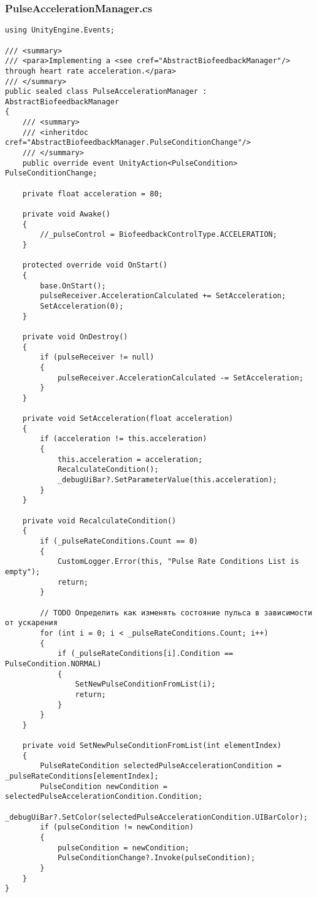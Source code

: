 \subsubsection*{PulseAccelerationManager.cs}
\begin{verbatim}
using UnityEngine.Events;

/// <summary>
/// <para>Implementing a <see cref="AbstractBiofeedbackManager"/> through heart rate acceleration.</para>
/// </summary>
public sealed class PulseAccelerationManager : AbstractBiofeedbackManager
{
    /// <summary>
    /// <inheritdoc cref="AbstractBiofeedbackManager.PulseConditionChange"/>
    /// </summary>
    public override event UnityAction<PulseCondition> PulseConditionChange;

    private float acceleration = 80;

    private void Awake()
    {
        //_pulseControl = BiofeedbackControlType.ACCELERATION;
    }

    protected override void OnStart()
    {
        base.OnStart();
        pulseReceiver.AccelerationCalculated += SetAcceleration;
        SetAcceleration(0);
    }

    private void OnDestroy()
    {
        if (pulseReceiver != null)
        {
            pulseReceiver.AccelerationCalculated -= SetAcceleration;
        }
    }

    private void SetAcceleration(float acceleration)
    {
        if (acceleration != this.acceleration)
        {
            this.acceleration = acceleration;
            RecalculateCondition();
            _debugUiBar?.SetParameterValue(this.acceleration);
        }
    }

    private void RecalculateCondition()
    {
        if (_pulseRateConditions.Count == 0)
        {
            CustomLogger.Error(this, "Pulse Rate Conditions List is empty");
            return;
        }

        // TODO Определить как изменять состояние пульса в зависимости от ускарения
        for (int i = 0; i < _pulseRateConditions.Count; i++)
        {
            if (_pulseRateConditions[i].Condition == PulseCondition.NORMAL)
            {
                SetNewPulseConditionFromList(i);
                return;
            }
        }
    }

    private void SetNewPulseConditionFromList(int elementIndex)
    {
        PulseRateCondition selectedPulseAccelerationCondition = _pulseRateConditions[elementIndex];
        PulseCondition newCondition = selectedPulseAccelerationCondition.Condition;
        _debugUiBar?.SetColor(selectedPulseAccelerationCondition.UIBarColor);
        if (pulseCondition != newCondition)
        {
            pulseCondition = newCondition;
            PulseConditionChange?.Invoke(pulseCondition);
        }
    }
}
\end{verbatim}
